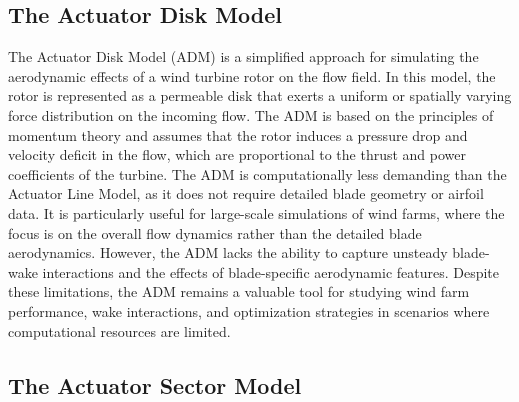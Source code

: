 \subsection{The Actuator Disk Model} 
The Actuator Disk Model (ADM) is a simplified approach for simulating the aerodynamic effects of a wind turbine rotor on the flow field. In this model, the rotor is represented as a permeable disk that exerts a uniform or spatially varying force distribution on the incoming flow. The ADM is based on the principles of momentum theory and assumes that the rotor induces a pressure drop and velocity deficit in the flow, which are proportional to the thrust and power coefficients of the turbine. The ADM is computationally less demanding than the Actuator Line Model, as it does not require detailed blade geometry or airfoil data. It is particularly useful for large-scale simulations of wind farms, where the focus is on the overall flow dynamics rather than the detailed blade aerodynamics. However, the ADM lacks the ability to capture unsteady blade-wake interactions and the effects of blade-specific aerodynamic features. Despite these limitations, the ADM remains a valuable tool for studying wind farm performance, wake interactions, and optimization strategies in scenarios where computational resources are limited.
\subsection{The Actuator Sector Model} 


